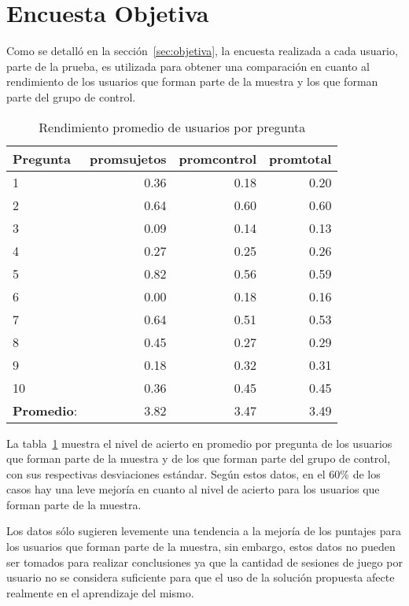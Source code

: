 
\section{Encuesta Objetiva}
\label{sec:res_objetiva}

Como se detalló en la sección~\ref{sec:objetiva}, la encuesta realizada a cada
usuario, parte de la prueba, es utilizada para obtener una comparación en cuanto
al rendimiento de los usuarios que forman parte de la muestra y los que forman
parte del grupo de control.


\begin{table}[!hbt]
\centering
\begin{tabular}{lrrr}
\toprule
\textbf{Pregunta} & 
\textbf{promsujetos} & 
\textbf{promcontrol} & 
\textbf{promtotal} \\ 
\midrule
1         & 0.36 & 0.18 & 0.20 \\
2         & 0.64 & 0.60 & 0.60 \\
3         & 0.09 & 0.14 & 0.13 \\
4         & 0.27 & 0.25 & 0.26 \\
5         & 0.82 & 0.56 & 0.59 \\
6         & 0.00 & 0.18 & 0.16 \\
7         & 0.64 & 0.51 & 0.53 \\
8         & 0.45 & 0.27 & 0.29 \\
9         & 0.18 & 0.32 & 0.31 \\
10        & 0.36 & 0.45 & 0.45 \\
\midrule
\textbf{Promedio}: & 3.82 & 3.47 & 3.49  \\
\bottomrule
\end{tabular}
\caption{Rendimiento promedio de usuarios por pregunta}
\label{tab:objetiva_rendimiento_por_pregunta}
\end{table}

La tabla~\ref{tab:objetiva_rendimiento_por_pregunta} muestra el nivel de acierto
en promedio por pregunta de los usuarios que forman parte de la muestra y de los
que forman parte del grupo de control, con sus respectivas desviaciones
estándar. Según estos datos, en el $60\%$ de los casos hay una leve mejoría en
cuanto al nivel de acierto para los usuarios que forman parte de la muestra.

Los datos sólo sugieren levemente una tendencia a la mejoría de los puntajes
para los usuarios que forman parte de la muestra, sin embargo, estos datos no
pueden ser tomados para realizar conclusiones ya que la cantidad de sesiones de
juego por usuario no se considera suficiente para que el uso de la solución
propuesta afecte realmente en el aprendizaje del mismo.
